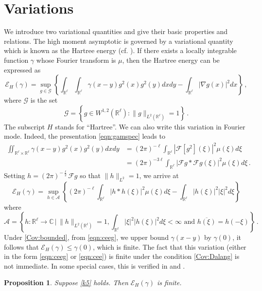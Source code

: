 \documentclass[12pt,reqno]{amsart}
\newtheorem{proposition}[theorem]{Proposition}
\theoremstyle{remark}
\let\Section=\section
\def\section{\setcounter{equation}{0}\Section}
\newcommand{\1}{\mathbf{1}}
\def\RR{\mathbb{R}}
\def\CC{\mathbb{C}}
\def\cee{{\mathcal E}}
\def\caa{{\mathcal A}}
\def\cff{{\mathcal F}}
\def\cgg{{\mathcal G}}
\def\lt{\left}
\def\rt{\right}
\begin{document}
\section{Variations}\label{sec:variations}
		We introduce two variational quantities and give their basic properties and relations. The high moment asymptotic is governed by a variational quantity which  is known as the Hartree energy (cf. \cite{ChPh15}). 
		If there exists a locally integrable function $\gamma$ whose Fourier transform is $\mu$, then the Hartree energy can be expressed as
		\begin{equation}\label{eqn:ceeg}
			\cee_H(\gamma)=\sup_{g\in\cgg}\lt\{\int_{\RR^\ell}\int_{\RR^\ell}\gamma(x-y)g^2(x)g^2(y)dxdy-\int_{\RR^\ell}|\nabla g(x) |^2dx \rt\}\,,
		\end{equation}
		where $\cgg$ is the set
		\begin{equation}\label{eq:G}
			\cgg=\lt\{g\in W^{1,2}(\RR^\ell):\|g\|_{L^2(\RR^\ell)}=1\rt\}\,.
		\end{equation}
		The subscript $H$ stands for ``Hartree''.
		We can also write this variation in Fourier mode. Indeed, the presentation \eqref{eqn:gamspec} leads to
		\begin{align*}
			\iint_{\RR^\ell\times\RR^\ell}\gamma(x-y)g^2(x)g^2(y)dxdy
			&=(2 \pi)^{-\ell}\int_{\RR^\ell}|\cff[g^2](\xi)|^2\mu(\xi)d \xi
			\\&=(2 \pi)^{-3\ell}\int_{\RR^\ell}|\cff g*\cff g(\xi)|^2\mu(\xi)d \xi\,.
		\end{align*}
		Setting $h=(2 \pi)^{-\frac\ell2}\cff g$ so that $\|h\|_{L^2}=1$, we arrive at
		\begin{equation}\label{eqn:cee}
			\cee_H(\gamma)=\sup_{h\in\caa}\lt\{(2 \pi)^{-\ell} \int_{\RR^\ell} |h*h(\xi)|^2 \mu( \xi)d \xi-\int_{\RR^\ell}|h(\xi)|^2|\xi|^2 d \xi \rt\}
		\end{equation}
		where
		\begin{equation*}
			\caa=\lt\{h:\RR^\ell\to\CC\,\Big|\,\|h\|_{L^2(\RR^\ell)}=1,\int_{\RR^\ell}|\xi|^2|h(\xi)|^2 d \xi<\infty \mbox{ and } \overline{h(\xi)}=h(- \xi)\rt\}\,.
		\end{equation*}
		Under \ref{Cov:bounded}, from \eqref{eqn:ceeg}, we upper bound $\gamma(x-y)$ by $\gamma(0)$, it follows that $\cee_H(\gamma)\le \gamma(0)$, which is finite.
		The fact that this variation (either in the form \eqref{eqn:ceeg} or \eqref{eqn:cee}) is finite under the condition \ref{Cov:Dalang} is not immediate. In some special cases, this is verified in \cite{MR3414457} and  \cite{Chetal16}.
		\begin{proposition}
			Suppose \eqref{k5} holds. 
			Then $\cee_H(\gamma)$ is finite.
		\end{proposition}
\end{document}
